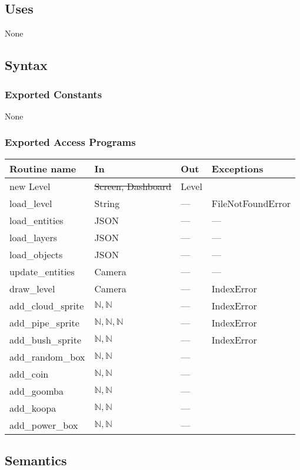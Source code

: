 \documentclass[12pt]{article}
\begin{document}
\subsection*{Uses}
None
\subsection*{Syntax}
\subsubsection*{Exported Constants}
None
\subsubsection*{Exported Access Programs}
\begin{tabular}{| l | l | l | p{5cm} |}
\hline
\textbf{Routine name} & \textbf{In} & \textbf{Out} & \textbf{Exceptions}\\
\hline
new Level & \st{Screen, Dashboard} & Level & \\
\hline
load\_level & String & --- & FileNotFoundError\\
\hline
load\_entities & JSON & --- & --- \\
\hline
load\_layers & JSON & --- & --- \\
\hline
load\_objects & JSON & --- & --- \\
\hline
update\_entities & Camera & ---  & --- \\
\hline
draw\_level & Camera & --- & IndexError\\
\hline
add\_cloud\_sprite & $\mathbb{N}, \mathbb{N}$ & ---  & IndexError\\
\hline
add\_pipe\_sprite  & $\mathbb{N}, \mathbb{N}, \mathbb{N}$ & ---  & IndexError\\
\hline
add\_bush\_sprite & $\mathbb{N}, \mathbb{N}$ & ---  & IndexError\\
\hline
add\_random\_box & $\mathbb{N}, \mathbb{N}$ & --- & \\
\hline
add\_coin & $\mathbb{N}, \mathbb{N}$ & --- &\\
\hline
add\_goomba & $\mathbb{N}, \mathbb{N}$ & --- &\\
\hline
add\_koopa & $\mathbb{N}, \mathbb{N}$ & --- &\\
\hline
\color{red}add\_power\_box & \color{red}$\mathbb{N}, \mathbb{N}$ & \color{red}--- &\\
\hline
\end{tabular}

\subsection*{Semantics}
\end{document}
